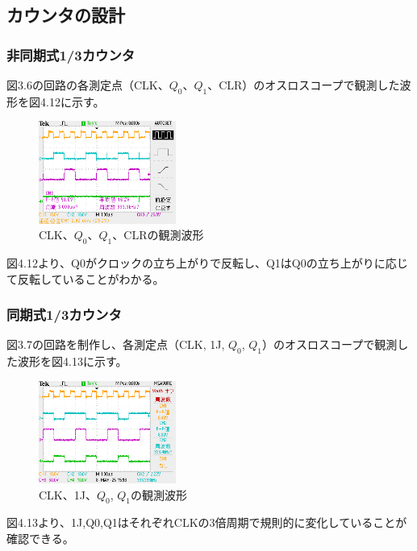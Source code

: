 \documentclass{jlreq}
\numberwithin{equation}{section}
\begin{document}
\subsection{カウンタの設計}
\subsubsection{非同期式1/3カウンタ}
図3.6の回路の各測定点（CLK、\(Q_0\)、\(Q_1\)、CLR）のオスロスコープで観測した波形を図4.12に示す。

\begin{figure}[H]
  \centering
  \includegraphics[width=0.4\textwidth]{assets/hidouki.png}
  \caption{CLK、\(Q_0\)、\(Q_1\)、CLRの観測波形}
\end{figure}

図4.12より、Q0がクロックの立ち上がりで反転し、Q1はQ0の立ち上がりに応じて反転していることがわかる。

\subsubsection{同期式1/3カウンタ}
図3.7の回路を制作し、各測定点（CLK, 1J, \(Q_0\), \(Q_1\)）のオスロスコープで観測した波形を図4.13に示す。

\begin{figure}[H]
  \centering
  \includegraphics[width=0.4\textwidth]{assets/douki.png}
  \caption{CLK、1J、\(Q_0\), \(Q_1\)の観測波形}
\end{figure}

図4.13より、1J,Q0,Q1はそれぞれCLKの3倍周期で規則的に変化していることが確認できる。
\end{document}
